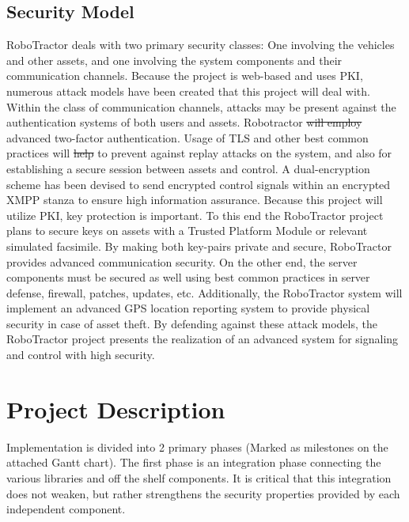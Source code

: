 \documentclass[conference,12pt]{IEEEtran}
\providecommand{\DIFaddtex}[1]{{\protect\color{blue}\uwave{#1}}} %
\providecommand{\DIFdeltex}[1]{{\protect\color{red}\sout{#1}}}                      %
\providecommand{\DIFaddbegin}{} %
\providecommand{\DIFaddend}{} %
\providecommand{\DIFdelbegin}{} %
\providecommand{\DIFdelend}{} %
\providecommand{\DIFadd}[1]{\texorpdfstring{\DIFaddtex{#1}}{#1}} %
\providecommand{\DIFdel}[1]{\texorpdfstring{\DIFdeltex{#1}}{}} %
\begin{document}
\subsection{Security Model}
RoboTractor deals with two primary security classes: One involving the vehicles
and other assets, and one involving the system components and their communication channels.
Because the project is web-based and uses PKI, numerous attack models have
been created that this project will deal with. Within the class of communication channels,
attacks may be present against the authentication systems of both users and assets. Robotractor \DIFdelbegin \DIFdel{will employ
}\DIFdelend \DIFaddbegin \DIFadd{currently employs
}\DIFaddend advanced two-factor authentication. Usage of TLS and other best common practices will \DIFdelbegin \DIFdel{help }\DIFdelend \DIFaddbegin \DIFadd{be implemented }\DIFaddend to prevent
against replay attacks on the system, and also for establishing a secure session between assets and control.
A dual-encryption scheme has been devised to send encrypted control signals within an encrypted XMPP stanza
to ensure high information assurance. Because this project will utilize PKI, key protection is important. To this end
the RoboTractor project plans to secure keys on assets with a Trusted Platform Module or relevant simulated facsimile.
By making both key-pairs private and secure, RoboTractor provides advanced communication security.
On the other end, the server components must be secured as well using best common practices in server defense, firewall,
patches, updates, etc. Additionally, the RoboTractor system will implement an advanced GPS location reporting system
to provide physical security in case of asset theft. By defending against these attack models, the RoboTractor project
presents the realization of an advanced system for signaling and control with high security. 

\section{Project Description}
\DIFaddbegin \label{sec:proj_desc}
\DIFaddend Implementation is divided into 2 primary phases (Marked as milestones on the
attached Gantt chart).  The first phase is an integration phase connecting
the various libraries and off the shelf components. It is critical that this
integration does not weaken, but rather strengthens the security properties
provided by each independent component. 
\end{document}
